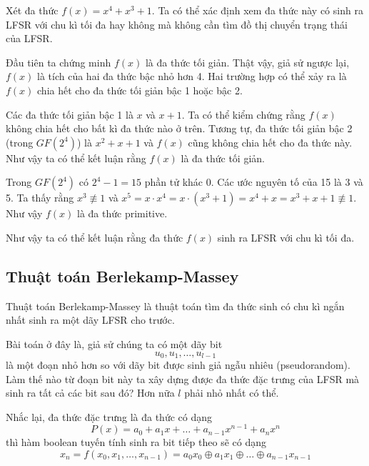 \begin{example}
	Xét đa thức $f(x) = x^4 + x^3 + 1$. Ta có thể xác định xem đa thức này có sinh ra LFSR với chu kì tối đa hay không mà không cần tìm đồ thị chuyển trạng thái của LFSR.
	
	Đầu tiên ta chứng minh $f(x)$ là đa thức tối giản. Thật vậy, giả sử ngược lại, $f(x)$ là tích của hai đa thức bậc nhỏ hơn 4. Hai trường hợp có thể xảy ra là $f(x)$ chia hết cho đa thức tối giản bậc 1 hoặc bậc 2.
	
	Các đa thức tối giản bậc 1 là $x$ và $x+1$. Ta có thể kiểm chứng rằng $f(x)$ không chia hết cho bất kì đa thức nào ở trên. Tương tự, đa thức tối giản bậc 2 (trong $GF(2^4)$) là $x^2 + x + 1$ và $f(x)$ cũng không chia hết cho đa thức này. Như vậy ta có thể kết luận rằng $f(x)$ là đa thức tối giản.
	
	Trong $GF(2^4)$ có $2^4 - 1 = 15$ phần tử khác 0. Các ước nguyên tố của 15 là 3 và 5. Ta thấy rằng $x^3 \not\equiv 1$ và $x^5 = x \cdot x^4 = x \cdot (x^3 + 1) = x^4 + x = x^3 + x + 1 \not\equiv 1$. Như vậy $f(x)$ là đa thức primitive.
	
	Như vậy ta có thể kết luận rằng đa thức $f(x)$ sinh ra LFSR với chu kì tối đa.
\end{example}

\subsection*{Thuật toán Berlekamp-Massey}

Thuật toán Berlekamp-Massey là thuật toán tìm đa thức sinh có chu kì ngắn nhất sinh ra một dãy LFSR cho trước.

Bài toán ở đây là, giả sử chúng ta có một dãy bit
\begin{equation*}
	u_0, u_1, \ldots, u_{l-1}
\end{equation*}
là một đoạn nhỏ hơn so với dãy bit được sinh giả ngẫu nhiêu (pseudorandom). Làm thế nào từ đoạn bit này ta xây dựng được đa thức đặc trưng của LFSR mà sinh ra tất cả các bit sau đó? Hơn nữa $l$ phải nhỏ nhất có thể.

Nhắc lại, đa thức đặc trưng là đa thức có dạng
\begin{equation*}
	P(x) = a_0 + a_1 x + \ldots + a_{n-1} x^{n-1} + a_n x^n
\end{equation*}
thì hàm boolean tuyến tính sinh ra bit tiếp theo sẽ có dạng
\begin{equation*}
	x_n = f(x_0, x_1, \ldots, x_{n-1}) = a_0 x_0 \oplus a_1 x_1 \oplus \ldots \oplus a_{n-1} x_{n-1}
\end{equation*}

